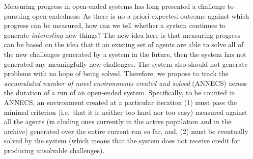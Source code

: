 \documentclass{article}
\newcommand{\removed}[1]{\comments{\textcolor{gray}{\sout{#1}}}}
\newcommand{\comments}[1]{#1} %
\begin{document}
Measuring progress in open-ended systems has long presented a challenge to pursuing open-endedness: As there is no a priori expected outcome against which progress can be measured, how can we tell whether a system continues to generate \emph{interesting} new things? 
The new idea here is that measuring progress can be based on 
the idea that
if an existing set of agents are able to solve all of the new challenges generated by a system in the future, then the system has not generated any meaningfully new challenges. 
The system also should not generate problems with no hope of being solved.
Therefore, we propose to track the \emph{accumulated number of novel environments created and solved} (ANNECS) across the duration of a run of an open-ended system. Specifically, to be counted in ANNECS, an environment created at a particular iteration (1) must pass the minimal criterion (i.e.\ that it is neither too hard nor too easy) measured against all the agents (in
cluding ones currently in the active population and in the archive) generated over the entire current run so far, %
and, (2) must be eventually solved by the system (which means that the system does not receive credit for producing unsolvable challenges). 
\end{document}
